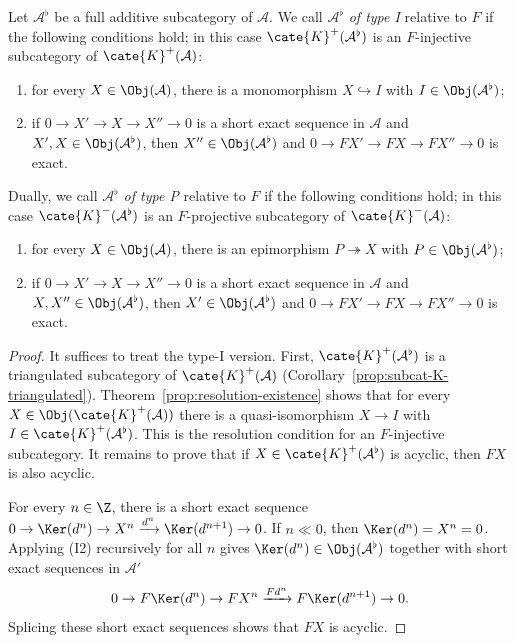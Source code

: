 \begin{definition-proposition}\label{prop:F-injective-criterion}
	Let $\mathcal{A}^\flat$ be a full additive subcategory of $\mathcal{A}$.
	We call $\mathcal{A}^\flat$ \emph{of type I} relative to $F$ if the
	following conditions hold; in this case
	$\cate{K}^+(\mathcal{A}^\flat)$ is an $F$-injective subcategory of
	$\cate{K}^+(\mathcal{A})$:
	\begin{enumerate}[({I}1)]
		\item for every $X\in\Obj(\mathcal{A})$, there is a monomorphism
		$X\hookrightarrow I$ with $I\in\Obj(\mathcal{A}^\flat)$;
		\item if $0\to X'\to X\to X''\to0$ is a short exact sequence in
		$\mathcal{A}$ and $X',X\in\Obj(\mathcal{A}^\flat)$, then
		$X''\in\Obj(\mathcal{A}^\flat)$ and
		$0\to FX'\to FX\to FX''\to0$ is exact.
	\end{enumerate}
	Dually, we call $\mathcal{A}^\flat$ \emph{of type P} relative to $F$ if
	the following conditions hold; in this case
	$\cate{K}^-(\mathcal{A}^\flat)$ is an $F$-projective subcategory of
	$\cate{K}^-(\mathcal{A})$:
	\begin{enumerate}[({P}1)]
		\item for every $X\in\Obj(\mathcal{A})$, there is an epimorphism
		$P\twoheadrightarrow X$ with $P\in\Obj(\mathcal{A}^\flat)$;
		\item if $0\to X'\to X\to X''\to0$ is a short exact sequence in
		$\mathcal{A}$ and $X,X''\in\Obj(\mathcal{A}^\flat)$, then
		$X'\in\Obj(\mathcal{A}^\flat)$ and
		$0\to FX'\to FX\to FX''\to0$ is exact.
	\end{enumerate}
\end{definition-proposition}
\begin{proof}
	It suffices to treat the type-I version. First,
	$\cate{K}^+(\mathcal{A}^\flat)$ is a triangulated subcategory of
	$\cate{K}^+(\mathcal{A})$ (Corollary~\ref{prop:subcat-K-triangulated}).
	Theorem~\ref{prop:resolution-existence} shows that for every
	$X\in\Obj(\cate{K}^+(\mathcal{A}))$ there is a quasi-isomorphism $X\to I$
	with $I\in\cate{K}^+(\mathcal{A}^\flat)$. This is the resolution condition
	for an $F$-injective subcategory. It remains to prove that if
	$X\in\cate{K}^+(\mathcal{A}^\flat)$ is acyclic, then $FX$ is also acyclic.

	For every $n\in\Z$, there is a short exact sequence
	$0\to\Ker(d^n)\to X^n\xrightarrow{d^n}\Ker(d^{n+1})\to0$. If $n\ll0$,
	then $\Ker(d^n)=X^n=0$. Applying (I2) recursively for all $n$ gives
	$\Ker(d^n)\in\Obj(\mathcal{A}^\flat)$ together with short exact sequences
	in $\mathcal{A}'$
	\[ 0 \to F\Ker(d^n) \to FX^n \xrightarrow{Fd^n} F\Ker(d^{n+1}) \to 0. \]
	Splicing these short exact sequences shows that $FX$ is acyclic.
\end{proof}

